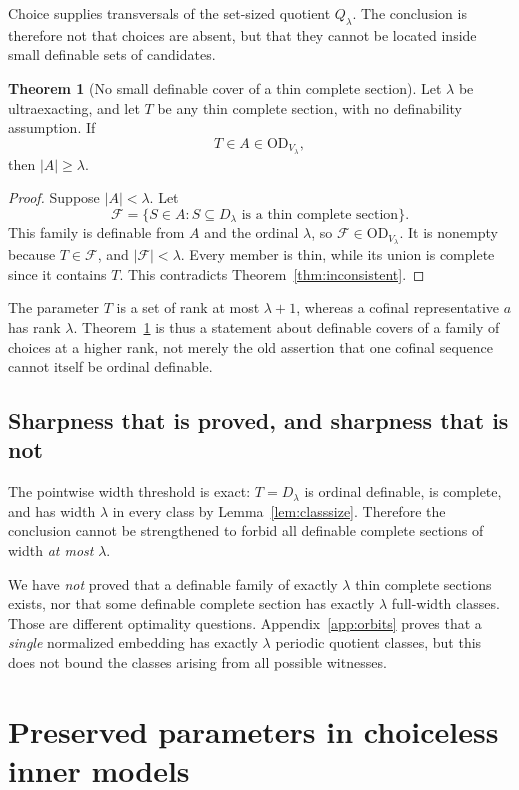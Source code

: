 \documentclass[11pt,letterpaper]{article}
\theoremstyle{definition}
\newtheorem{theorem}[definition]{Theorem}
\numberwithin{equation}{section}
\newcommand{\OD}{\mathrm{OD}}
\newcommand{\FF}{\mathcal F}
\begin{document}
Choice supplies transversals of the set-sized quotient $Q_\lambda$. The conclusion is therefore not that choices are absent, but that they cannot be located inside small definable sets of candidates.

\begin{theorem}[No small definable cover of a thin complete section]\label{thm:cover}
Let $\lambda$ be ultraexacting, and let $T$ be any thin complete section, with no definability assumption. If
\[
                       T\in A\in\OD_{V_\lambda},
\]
then $|A|\ge\lambda$.
\end{theorem}

\begin{proof}
Suppose $|A|<\lambda$. Let
\[
 \FF=\{S\in A:S\subseteq D_\lambda\text{ is a thin complete section}\}.
\]
This family is definable from $A$ and the ordinal $\lambda$, so $\FF\in\OD_{V_\lambda}$. It is nonempty because $T\in\FF$, and $|\FF|<\lambda$. Every member is thin, while its union is complete since it contains $T$. This contradicts Theorem~\ref{thm:inconsistent}.
\end{proof}

The parameter $T$ is a set of rank at most $\lambda+1$, whereas a cofinal representative $a$ has rank $\lambda$. Theorem~\ref{thm:cover} is thus a statement about definable covers of a family of choices at a higher rank, not merely the old assertion that one cofinal sequence cannot itself be ordinal definable.

\subsection{Sharpness that is proved, and sharpness that is not}

The pointwise width threshold is exact: $T=D_\lambda$ is ordinal definable, is complete, and has width $\lambda$ in every class by Lemma~\ref{lem:classsize}. Therefore the conclusion cannot be strengthened to forbid all definable complete sections of width \emph{at most} $\lambda$.

We have \emph{not} proved that a definable family of exactly $\lambda$ thin complete sections exists, nor that some definable complete section has exactly $\lambda$ full-width classes. Those are different optimality questions. Appendix~\ref{app:orbits} proves that a \emph{single} normalized embedding has exactly $\lambda$ periodic quotient classes, but this does not bound the classes arising from all possible witnesses.

\section{Preserved parameters in choiceless inner models}\label{sec:inner}
\end{document}
